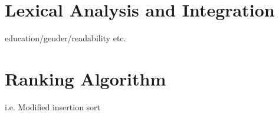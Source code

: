 \section{Lexical Analysis and Integration}

education/gender/readability etc.

\section{Ranking Algorithm}

i.e. Modified insertion sort